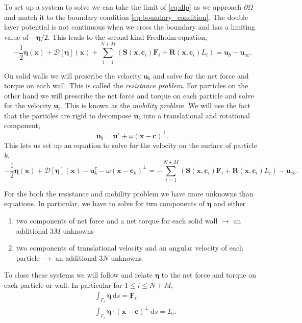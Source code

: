 \documentclass[preprint, 10pt]{elsarticle}
\begin{document}
 To set up a system to solve we can take the limit of \eqref{eq:dlp} as we approach $\partial\Omega$ and match it to the boundary condition \eqref{eq:boundary_condition}. The double layer potential is not continuous when we cross the boundary and has a limiting value of $-\pmb{\eta}/2$. This leads to the second kind Fredholm equation,
\begin{equation}\label{eq:vel_walls} -\frac{1}{2}\pmb{\eta}(\mathbf{x}) + \mathcal{D}[\pmb{\eta}](\mathbf{x}) + \sum\limits_{i=1}^{N+M} \left(\mathbf{S}(\mathbf{x},\mathbf{c}_i)\mathbf{F}_i + \mathbf{R}(\mathbf{x},\mathbf{c}_i)L_i\right) = \mathbf{u}_b - \mathbf{u}_\infty.\end{equation}

On solid walls we will prescribe the velocity $\mathbf{u}_b$ and solve for the net force and torque on each wall. This is called the \textit{resistance problem}. For particles on the other hand we will prescribe the net force and torque on each particle and solve for the velocity $\mathbf{u}_b$. This is known as the \textit{mobility problem}. We will use the fact that the particles are rigid to decompose $\mathbf{u}_b$ into a translational and rotational component,
\[ \mathbf{u}_b = \mathbf{u}^\tau + \omega(\mathbf{x}-\mathbf{c})^\perp.\]
This lets us set up an equation to solve for the velocity on the surface of particle $k$,
\begin{equation}\label{eq:vel_particles} -\frac{1}{2}\pmb{\eta}(\mathbf{x}) + \mathcal{D}[\pmb{\eta}](\mathbf{x}) - \mathbf{u}^\tau_k - \omega(\mathbf{x}-\mathbf{c}_k)^\perp =  -\sum\limits_{i=1}^{N+M} \left(\mathbf{S}(\mathbf{x},\mathbf{c}_i)\mathbf{F}_i + \mathbf{R}(\mathbf{x},\mathbf{c}_i)L_i\right) - \mathbf{u}_\infty.\end{equation}

For the both the resistance and mobility problem we have more unknowns than equations. In particular, we have to solve for two components of $\pmb{\eta}$ and either 
\begin{enumerate}[label=(\alph*)]
	\item two components of net force and a net torque for each solid wall $\rightarrow$ an additional $3M$ unknowns
	\item two components of translational velocity and an angular velocity of each particle $\rightarrow$ an additional $3N$ unknowns
\end{enumerate}

To close these systems we will follow \cite{Power1993} and relate $\pmb{\eta}$ to the net force and torque on each particle or wall. In particular for $1\leq i \leq N+M$,
\begin{subequations}\label{eq:closure}
\begin{align}
	&\int_{\Gamma_i} \pmb{\eta}~\text{d}s = \mathbf{F}_i,\\
	&\int_{\Gamma_i} \pmb{\eta}\cdot (\mathbf{x} - \mathbf{c})^\perp~\text{d}s = L_i.
\end{align} 
\end{subequations}
\end{document}
